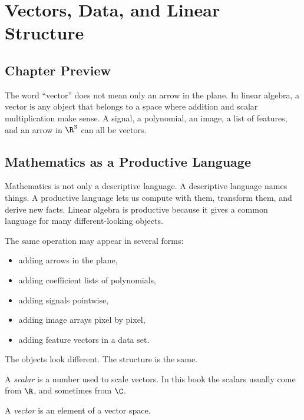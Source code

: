 \chapter{Vectors, Data, and Linear Structure}
\label{ch:vectors-data}

\section*{Chapter Preview}

The word ``vector'' does not mean only an arrow in the plane. In linear
algebra, a vector is any object that belongs to a space where addition and
scalar multiplication make sense. A signal, a polynomial, an image, a list of
features, and an arrow in $\R^3$ can all be vectors.

\section{Mathematics as a Productive Language}

Mathematics is not only a descriptive language. A descriptive language names
things. A productive language lets us compute with them, transform them, and
derive new facts. Linear algebra is productive because it gives a common
language for many different-looking objects.

The same operation may appear in several forms:

\begin{itemize}
  \item adding arrows in the plane,
  \item adding coefficient lists of polynomials,
  \item adding signals pointwise,
  \item adding image arrays pixel by pixel,
  \item adding feature vectors in a data set.
\end{itemize}

The objects look different. The structure is the same.

\begin{definition}
  A \emph{scalar} is a number used to scale vectors. In this book the scalars
  usually come from $\R$, and sometimes from $\C$.
\end{definition}

\begin{definition}
  A \emph{vector} is an element of a vector space.
\end{definition}

